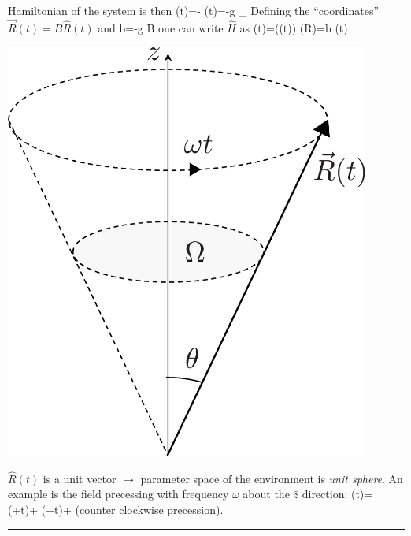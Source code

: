 \documentclass[12pt]{article}
\begin{document}
\begin{minipage}{0.6\textwidth}
\setcounter{equation}{77}
Hamiltonian of the system is then
\be
{}(t)=-\hat{\vec{\mu}} \cdot {}(t)=-g _{}  \cdot {}
\ee	
Defining the ``coordinates'' $\vec{R}(t)=B \hat{R}(t)$ and
\be
b=-g  B
\ee
one can write $\hat{H}$ as
\be
{}(t)=((t)) \equiv {}(R)=b (t) \cdot {}
\label{eq:g80}
\ee
\end{minipage}%
\begin{minipage}{0.4\textwidth}
\hfill\includegraphics[width=0.9\textwidth]{Figures/RotatingVector-crop.pdf}
\end{minipage}

$\hat{R}(t)$ is a unit vector $\rightarrow$ parameter space of the
environment is \emph{unit sphere}.
An example is the field precessing with
frequency $\omega$ about the $\hat{z}$ direction:
\be
{}(t)= \sin \theta \cos (\phi+\omega t)+  \sin \theta \sin (\phi+\omega t)+ \cos \theta
\label{eq:g81}
\ee
(counter clockwise precession).

\normalsize
\rule{\textwidth}{1pt}

\end{document}

